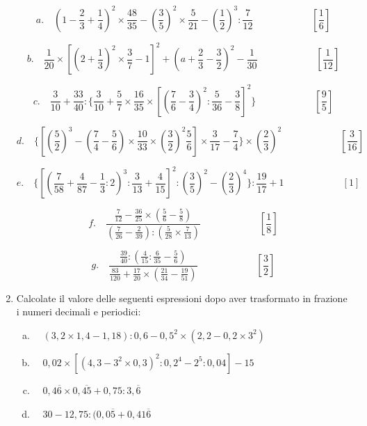 \documentclass[]{article}
\newcommand*\result[1] {\hspace*{0em plus 1fill}{\footnotesize \makebox{[#1]}}}
\begin{document}
\begin{enumerate}
		\[a.\quad \left( 1-\frac23+\frac14 \right)^2\times\frac{48}{35}-\left(\frac35\right)^2\times\frac5{21}-\left(\frac12\right)^3:\frac7{12}\qquad\qquad\qquad\left[\frac16\right] \]
		
		\[b.\quad\frac1{20}\times\left[\left(2+\frac13\right)^2\times\frac37-1\right]^2+\left(a+\frac23-\frac32\right)^2-\frac1{30}\qquad\qquad\qquad\left[\frac1{12}\right]\]
		
		\[c.\quad\frac3{10}+\frac{33}{40}:\Bigg\{\frac3{10}+\frac57\times\frac{16}{35}\times\left[\left(\frac76-\frac34\right)^2:\frac5{36}-\frac38\right]^2\Bigg\}\qquad\qquad\qquad\left[\frac95\right]\]
		
		\[d.\quad\Bigg\{\left[\left(\frac52\right)^3-\left(\frac74-\frac56\right)\times\frac{10}{33}\times\left(\frac32\right)^2\frac56\right]\times\frac3{17}-\frac74\Bigg\}\times\left(\frac23\right)^2\qquad\qquad\qquad\left[\frac3{16}\right]\]
		
		\[e.\quad\Bigg\{\left[\left(\frac7{58}+\frac4{87}-\frac13:2\right)^3:\frac3{13}+\frac4{15}\right]^2:\left(\frac35\right)^2-\left(\frac23\right)^4\Bigg\}:\frac{19}{17}+1\qquad\qquad\qquad\left[1\right]\]
		
		\[f.\quad\frac{\frac7{12}-\frac{36}{25}\times\left(\frac56-\frac58\right)}{\left(\frac7{26}-\frac2{39}\right):\left(\frac5{28}\times\frac7{13}\right)}\qquad\qquad\qquad\left[\frac18\right]\]
		
		\[g.\quad\frac{\frac{39}{40}:\left(\frac4{15}:\frac6{35}-\frac56\right)}{\frac{83}{120}+\frac{17}{20}\times\left(\frac{21}{34}-\frac{19}{51}\right)}\qquad\qquad\qquad\left[\frac32\right]\]
		
		
		\item Calcolate il valore delle seguenti espressioni dopo aver trasformato in frazione i numeri decimali e periodici:
		
		\begin{enumerate}[a.]
			\item \(\quad(3,2\times1,4-1,18):0,6-0,5^2\times(2,2-0,2\times3^2)\) \result{\(\frac{27}5\)}
			
			\item \(\quad0,02\times[(4,3-3^2\times0,3)^2:0,2^4-2^5:0,04]-15\) \result{1}
			
			\item \(\quad0,4\overline{6}\times0,\overline{45}+0,75:3,\overline6\) \result{\(	\frac5{12}\)}
			
			\item \(\quad30-12,75:(0,0\overline5+0,41\overline6\) \result{3}
		\end{enumerate}
		

\end{enumerate}
\end{document}
